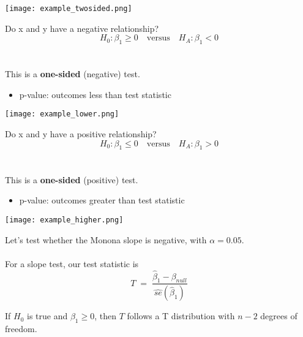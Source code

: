 \documentclass[xcolor={dvipsnames,svgnames},14pt]{beamer}
\begin{document}
\begin{frame}
\begin{center}
\texttt{[image: example\_twosided.png]}
\end{center}
\end{frame}

\begin{frame}
Do x and y have a negative relationship?
$$H_0: \beta_1 \ge 0 \quad \text{versus} \quad H_A: \beta_1 < 0$$ \\~\\
This is a \textbf{one-sided} (negative) test. \begin{itemize}
\item p-value: outcomes less than test statistic
\end{itemize}
\end{frame}

\begin{frame}
\begin{center}
\texttt{[image: example\_lower.png]}
\end{center}
\end{frame}

\begin{frame}
Do x and y have a positive relationship?
$$H_0: \beta_1 \le 0 \quad \text{versus} \quad H_A: \beta_1 > 0$$ \\~\\
This is a \textbf{one-sided} (positive) test. \begin{itemize}
\item p-value: outcomes greater than test statistic
\end{itemize}
\end{frame}

\begin{frame}
\begin{center}
\texttt{[image: example\_higher.png]}
\end{center}
\end{frame}

\begin{frame}
Let's test whether the Monona slope is negative, with $\alpha = 0.05$. \\~\\

For a slope test, our test statistic is 
$$T \;=\; \frac{\hat{\beta}_1 - \beta_{null}}{\hat{se}(\hat{\beta}_1)}$$

If $H_0$ is true and $\beta_1 \ge 0$, then $T$ follows a T distribution with $n-2$ degrees of freedom.
\end{frame}
\end{document}
